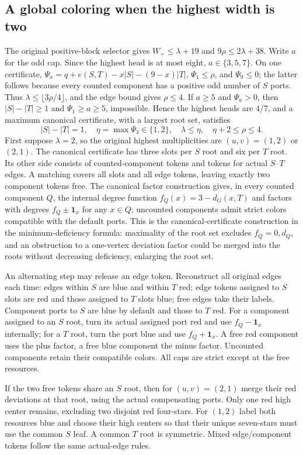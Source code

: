 \documentclass[11pt,a4paper]{article}
\theoremstyle{definition}
\begin{document}
\subsection{A global coloring when the highest width is two}
The original positive-block selector gives $W_+\le\lambda+19$ and $9\rho\le2\lambda+38$.
Write $a$ for the odd cap. Since the highest head is at most eight, $a\in\{3,5,7\}$.
On one certificate,
$\Psi_x=q+e(S,T)-x|S|-(9-x)|T|$,
$\Psi_1\le\rho$, and $\Psi_9\le0$; the latter follows because every counted component has a positive odd number of $S$ ports.
Thus $\lambda\le\lfloor3\rho/4\rfloor$, and the edge bound gives $\rho\le4$.
If $a\ge5$ and $\Psi_a>0$, then $|S|-|T|\ge1$ and $\Psi_1\ge a\ge5$, impossible. Hence the highest heads are $4/7$, and a maximum canonical certificate, with a largest root set, satisfies
\[
|S|-|T|=1,\quad \eta=\max\Psi_3\in\{1,2\},\quad
\lambda\le\eta,\quad \eta+2\le\rho\le4.
\]
First suppose $\lambda=2$, so the original highest multiplicities are $(u,v)=(1,2)$ or $(2,1)$. The canonical certificate has three slots per $S$ root and six per $T$ root. Its other side consists of counted-component tokens and tokens for actual $S$--$T$ edges. A matching covers all slots and all edge tokens, leaving exactly two component tokens free. The canonical factor construction gives, in every counted component $Q$, the internal degree function
$f_Q(x)=3-d_G(x,T)$ and factors with degrees $f_Q\pm\mathbf1_x$ for any $x\in Q$; uncounted components admit strict colors compatible with the default ports. This is the canonical-certificate construction in the minimum-deficiency formula: maximality of the root set excludes $f_Q=0,d_Q$, and an obstruction to a one-vertex deviation factor could be merged into the roots without decreasing deficiency, enlarging the root set.

An alternating step may release an edge token. Reconstruct all original edges each time: edges within $S$ are blue and within $T$ red; edge tokens assigned to $S$ slots are red and those assigned to $T$ slots blue; free edges take their labels. Component ports to $S$ are blue by default and those to $T$ red. For a component assigned to an $S$ root, turn its actual assigned port red and use $f_Q-\mathbf1_x$ internally; for a $T$ root, turn the port blue and use $f_Q+\mathbf1_x$. A free red component uses the plus factor, a free blue component the minus factor. Uncounted components retain their compatible colors. All caps are strict except at the free resources.

If the two free tokens share an $S$ root, then for $(u,v)=(2,1)$ merge their red deviations at that root, using the actual compensating ports. Only one red high center remains, excluding two disjoint red four-stars. For $(1,2)$ label both resources blue and choose their high centers so that their unique seven-stars must use the common $S$ leaf. A common $T$ root is symmetric. Mixed edge/component tokens follow the same actual-edge rules.
\end{document}
